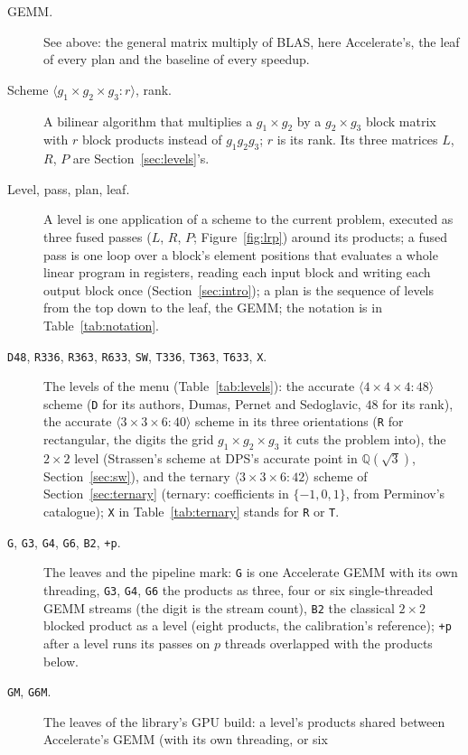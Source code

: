 \documentclass[11pt]{article}
\newcommand{\mm}[1]{\langle #1\rangle}
\newcommand{\lv}[1]{\texttt{#1}}
\begin{document}
\begin{description}
\item[GEMM.]  See above: the general matrix multiply of BLAS, here
  Accelerate's, the leaf of every plan and the baseline of every speedup.
\item[Scheme $\mm{g_1\times g_2\times g_3:r}$, rank.]  A bilinear algorithm
  that multiplies a $g_1\times g_2$ by a $g_2\times g_3$ block matrix with $r$
  block products instead of $g_1g_2g_3$; $r$ is its rank.  Its three matrices
  $L$, $R$, $P$ are Section~\ref{sec:levels}'s.
\item[Level, pass, plan, leaf.]  A level is one application of a scheme to
  the current problem, executed as three fused passes ($L$, $R$, $P$;
  Figure~\ref{fig:lrp}) around
  its products; a fused pass is one loop over a block's element positions
  that evaluates a whole linear program in registers, reading each input
  block and writing each output block once (Section~\ref{sec:intro}); a plan is the sequence of levels from the top down to the
  leaf, the GEMM; the notation is in Table~\ref{tab:notation}.
\item[\lv{D48}, \lv{R336}, \lv{R363}, \lv{R633}, \lv{SW}, \lv{T336},
  \lv{T363}, \lv{T633}, \lv{X}.]  The levels of the menu (Table~\ref{tab:levels}):
  the accurate $\mm{4\times4\times4:48}$ scheme (\lv{D} for its authors, Dumas, Pernet and
  Sedoglavic, $48$ for its rank), the accurate $\mm{3\times3\times6:40}$ scheme in
  its three orientations (\lv{R} for rectangular, the digits the grid
  $g_1\times g_2\times g_3$ it cuts the problem into), the $2\times2$ level
  (Strassen's scheme at DPS's accurate point in $\mathbb{Q}(\sqrt3)$, Section~\ref{sec:sw}),
  and the ternary $\mm{3\times3\times6:42}$ scheme of Section~\ref{sec:ternary}
(ternary: coefficients in $\{-1,0,1\}$, from Perminov's catalogue); \lv{X} in
  Table~\ref{tab:ternary} stands for \lv{R} or \lv{T}.
\item[\lv{G}, \lv{G3}, \lv{G4}, \lv{G6}, \lv{B2}, \lv{+p}.]  The leaves and the
  pipeline mark: \lv{G} is one Accelerate GEMM with its own threading,
  \lv{G3}, \lv{G4}, \lv{G6} the products as three, four or six single-threaded
  GEMM streams (the digit is the stream count), \lv{B2} the classical
  $2\times2$ blocked product as a level (eight products, the calibration's
  reference); \lv{+p} after a level runs its passes on $p$ threads overlapped
  with the products below.
\item[\lv{GM}, \lv{G6M}.]  The leaves of the library's GPU build: a level's
  products shared between Accelerate's GEMM (with its own threading, or six

\end{description}
\end{document}
